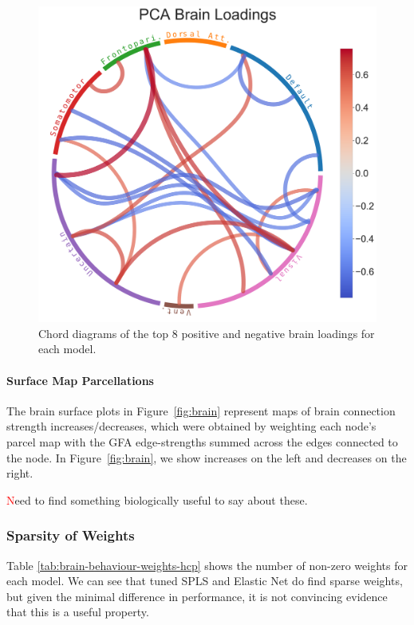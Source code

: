 \begin{figure}
\includegraphics[width=0.49\linewidth]{figures/regularization/hcp/PCA brain loadings}
\caption{Chord diagrams of the top 8 positive and negative brain loadings for each model.}\label{fig:chord_loadings}
\end{figure}

\paragraph{Surface Map Parcellations}
The brain surface plots in Figure~\ref{fig:brain} represent maps of brain connection strength increases/decreases, which
were obtained by weighting each node’s parcel map with the GFA edge-strengths summed across the edges
connected to the node.
In Figure~\ref{fig:brain}, we show increases on the left and decreases on the right.

\textcolor{red} Need to find something biologically useful to say about these.
%

\subsubsection{Sparsity of Weights}

Table \ref{tab:brain-behaviour-weights-hcp} shows the number of non-zero weights for each model.
We can see that tuned SPLS and Elastic Net do find sparse weights, but given the minimal difference in performance, it is not convincing evidence that this is a useful property.


